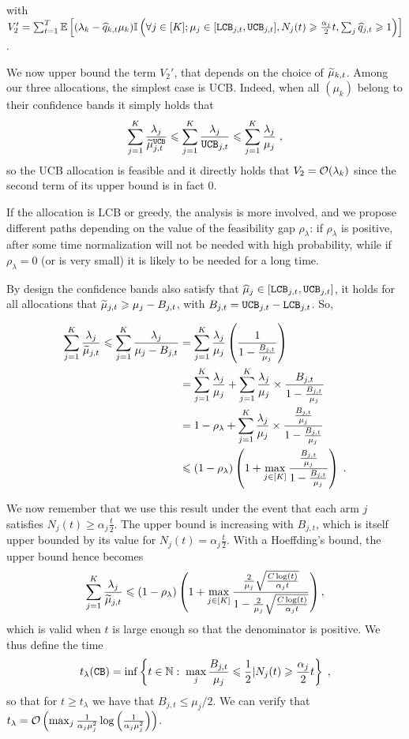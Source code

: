 with $V_2'=\sum_{t=1}^T \mathbb{E}\left[(\lambda_k - \widehat{q}_{k,t}\mu_k)\mathbb{I}\left(\forall j \in [K]; \mu_j \in [\texttt{LCB}_{j, t}, \texttt{UCB}_{j, t}], N_j(t)\geqslant \frac{\alpha_j}{2}t, \sum_j \widehat{q}_{j,t} \geqslant 1\right)\right]$.

We now upper bound the term $V_2'$, that depends on the choice of $\widetilde{\mu}_{k,t}$. Among our three allocations, the simplest case is UCB. Indeed, when all $(\mu_k)$ belong to their confidence bands it simply holds that  \[\sum_{j=1}^K \frac{\lambda_j}{\widetilde{\mu}_{j,t}^{\texttt{UCB}}} \leqslant \sum_{j=1}^K \frac{\lambda_j}{ \texttt{UCB}_{j,t}} \leqslant \sum_{j=1}^K \frac{\lambda_j}{ \mu_j}\;,\] so the UCB allocation is feasible and it directly holds that $V_2=\mathcal{O}(\lambda_k)$ since the second term of its upper bound is in fact $0$.

If the allocation is LCB or greedy, the analysis is more involved, and we propose different paths depending  on the value of the feasibility gap $\rho_\lambda$: if $\rho_\lambda$ is positive, after some time normalization will not be needed with high probability, while if $\rho_\lambda=0$ (or is very small) it is likely to be needed for a long time.

By design the confidence bands also satisfy that $\widehat{\mu}_j \in [\texttt{LCB}_{j, t}, \texttt{UCB}_{j, t}]$, it holds for all allocations that $\widetilde{\mu}_{j, t}\geqslant \mu_j- B_{j, t}$, with $B_{j,t} = \texttt{UCB}_{j, t} - \texttt{LCB}_{j, t}$. So, 

\begin{align*}
\sum_{j=1}^K \frac{\lambda_j}{\widetilde{\mu}_{j, t}} \leqslant \sum_{j=1}^K \frac{\lambda_j}{\mu_j - B_{j, t}} &= \sum_{j=1}^K \frac{\lambda_j}{\mu_j}\left(\frac{1}{1-\frac{B_{j, t}}{\mu_j}}\right) \\ &= \sum_{j=1}^K \frac{\lambda_j}{\mu_j} + \sum_{j=1}^K \frac{\lambda_j}{\mu_j}\times \frac{B_{j, t}}{1 - \frac{B_{j, t}}{\mu_j}} \\
& = 1-\rho_\lambda +\sum_{j=1}^K \frac{\lambda_j}{\mu_j}\times \frac{\frac{B_{j, t}}{\mu_j}}{1 - \frac{B_{j, t}}{\mu_j}}   \\
& \leqslant (1-\rho_\lambda)\left(1+ \max_{j\in[K]}\frac{\frac{B_{j, t}}{\mu_j}}{1 - \frac{B_{j, t}}{\mu_j}} \right) \;.  \\
\end{align*}

We now remember that we use this result under the event that each arm $j$ satisfies $N_j(t)\geq \alpha_j \frac{t}{2}$. The upper bound is increasing with $B_{j,t }$, which is itself upper bounded by its value for $N_j(t)= \alpha_j \frac{t}{2}$. With a Hoeffding's bound, the upper bound hence becomes 
\[\sum_{j=1}^K \frac{\lambda_j}{\widetilde{\mu}_{j, t}} \leqslant (1-\rho_\lambda)\left(1+ \max_{j\in[K]}\frac{\frac{2}{\mu_j}\sqrt{\frac{C\log(t)}{\alpha_j t}}}{1-\frac{2}{\mu_j}\sqrt{\frac{C\log(t)}{\alpha_j t}}} \right),\]
which is valid when $t$ is large enough so that the denominator is positive. We thus define the time \[t_\lambda(\texttt{CB})= \inf\left\{t \in \mathbb{N}: \; \max_j \frac{B_{j,t}}{\mu_j}\leqslant \frac{1}{2} | N_j(t)\geqslant \frac{\alpha_j}{2}t \right\}\;,\] so that for $t\geq t_\lambda$ we have that $B_{j,t}\leq \mu_j/2$. We can verify that $t_\lambda=\mathcal{O}\left(\max_j\frac{1}{\alpha_j\mu_j^2}\log\left(\frac{1}{\alpha_j\mu_j^2}\right)\right)$.

